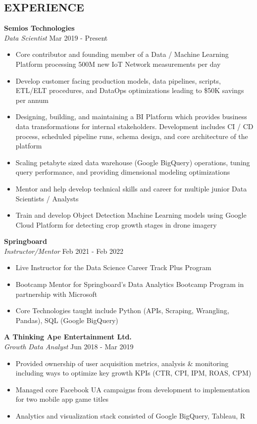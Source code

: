 \documentclass[margin]{res}
\begin{document}
\begin{resume}

\section{EXPERIENCE}

\textbf{Semios Technologies }
    \\ {\sl Data Scientist} \hfill{Mar 2019 - Present} 

\begin{itemize}
  \item Core contributor and founding member of a Data / Machine Learning Platform processing 500M new IoT Network measurements per day
  \item Develop customer facing production models, data pipelines, scripts, ETL/ELT procedures, and DataOps optimizations leading to \$50K savings per annum
  \item Designing, building, and maintaining a BI Platform which provides business data transformations for internal stakeholders. Development includes CI / CD process, scheduled pipeline runs, schema design, and core architecture of the platform
  \item Scaling petabyte sized data warehouse (Google BigQuery) operations, tuning query performance, and providing dimensional modeling optimizations
  \item Mentor and help develop technical skills and career for multiple junior Data Scientists / Analysts
  \item Train and develop Object Detection Machine Learning models using Google Cloud Platform for detecting crop growth stages in drone imagery
\end{itemize}

\textbf{Springboard} 
    \\ {\sl Instructor/Mentor} \hfill{Feb 2021 - Feb 2022}
\begin{itemize}
    \item Live Instructor for the Data Science Career Track Plus Program
    \item Bootcamp Mentor for Springboard's Data Analytics Bootcamp Program in partnership with Microsoft
    \item Core Technologies taught include Python (APIs, Scraping, Wrangling, Pandas), SQL (Google BigQuery)
\end{itemize}

\textbf{A Thinking Ape Entertainment Ltd.} 
    \\ {\sl Growth Data Analyst} \hfill{Jun 2018 - Mar 2019}
\begin{itemize}
  \item Provided ownership of user acquisition metrics, analysis \& monitoring including ways to optimize key growth KPIs (CTR, CPI, IPM, ROAS, CPM)
  \item Managed core Facebook UA campaigns from development to implementation for two mobile app game titles
  \item Analytics and visualization stack consisted of Google BigQuery, Tableau, R
\end{itemize}


\end{resume}
\end{document}
